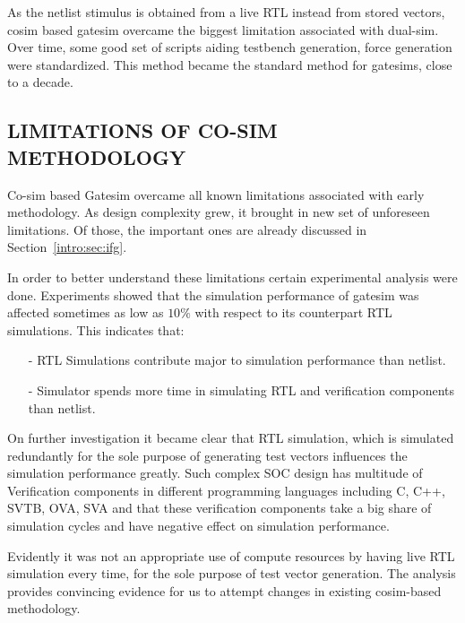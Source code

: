 As the netlist stimulus is obtained from a live RTL instead from stored vectors, cosim based gatesim overcame the biggest limitation associated with dual-sim. Over time, some good set of scripts aiding testbench generation, force generation were standardized. This method became the standard method for gatesims, close to a decade.

\subsection {LIMITATIONS OF CO-SIM METHODOLOGY}

Co-sim based Gatesim overcame all known limitations associated with early methodology. As design complexity grew, it brought in new set of unforeseen limitations. Of those, the important ones are already discussed in Section~\ref{intro:sec:ifg}.

In order to better understand these limitations certain experimental analysis were done. Experiments showed that the simulation performance of gatesim was affected sometimes as low as $10\%$ with respect to its counterpart RTL simulations. This indicates that:

\begin{itemize}
	\item[-]RTL Simulations contribute major to simulation performance than netlist.
	\item[-]Simulator spends more time in simulating RTL and verification components than netlist.
\end{itemize}

On further investigation it became clear that RTL simulation, which is simulated redundantly for the sole purpose of generating test vectors influences the simulation performance greatly. Such complex SOC design has multitude of Verification components in different programming languages including C, C++, SVTB, OVA, SVA and that these verification components take a big share of simulation cycles and have negative effect on simulation performance.

Evidently it was not an appropriate use of compute resources by having live RTL simulation every time, for the sole purpose of test vector generation. The analysis provides convincing evidence for us to attempt changes in existing cosim-based methodology.

